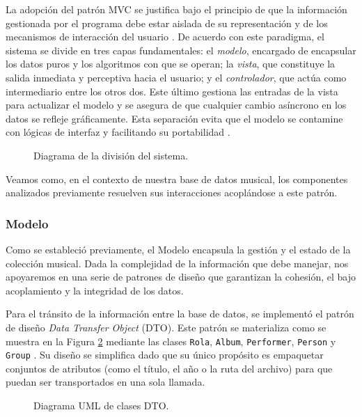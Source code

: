 \documentclass{rep}
\begin{document}
    La adopción del patrón MVC se justifica bajo el principio de que
    la información gestionada por el programa debe estar aislada de su
    representación y de los mecanismos de interacción del usuario
    \cite{becerril}. De acuerdo con este paradigma, el sistema se
    divide en tres capas fundamentales: el \textit{modelo}, encargado
    de encapsular los datos puros y los algoritmos con que se operan;
    la \textit{vista}, que constituye la salida inmediata y perceptiva
    hacia el usuario; y el \textit{controlador}, que actúa como
    intermediario entre los otros dos. Este último gestiona las
    entradas de la vista para actualizar el modelo y se asegura de que
    cualquier cambio asíncrono en los datos se refleje
    gráficamente. Esta separación evita que el modelo se contamine con
    lógicas de interfaz y facilitando su portabilidad \cite{becerril}.

     \begin{figure}[htbp]
		\centering
        
		\caption{Diagrama de la división del sistema.}
		\label{fig:div_mvc}
	\end{figure}

    Veamos como, en el contexto de nuestra base de datos musical, los
    componentes analizados previamente resuelven sus interacciones
    acoplándose a este patrón.

    \subsubsection{Modelo}

    Como se estableció previamente, el Modelo encapsula la gestión y
    el estado de la colección musical. Dada la complejidad de la
    información que debe manejar, nos apoyaremos en una serie de
    patrones de diseño que garantizan la cohesión, el bajo
    acoplamiento y la integridad de los datos.

    Para el tránsito de la información entre la base de datos, se
    implementó el patrón de diseño \textit{Data Transfer Object}
    (DTO). Este patrón se materializa como se muestra en la Figura
    \ref{fig:DTOs} mediante las clases \texttt{Rola}, \texttt{Album},
    \texttt{Performer}, \texttt{Person} y \texttt{Group} . Su diseño
    se simplifica dado que su único propósito es empaquetar conjuntos
    de atributos (como el título, el año o la ruta del archivo) para
    que puedan ser transportados en una sola llamada.

    \begin{figure}[htbp]
      \centering
        
        \caption{Diagrama UML de clases DTO.}
        \label{fig:DTOs}
    \end{figure}
    
\end{document}
